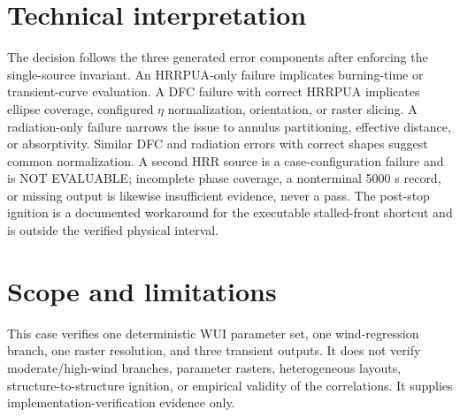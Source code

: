 \section{Technical interpretation}

The \VerificationStatus{} decision follows the three generated error components after enforcing the single-source invariant. An HRRPUA-only failure implicates burning-time or transient-curve evaluation. A DFC failure with correct HRRPUA implicates ellipse coverage, configured \(\eta\) normalization, orientation, or raster slicing. A radiation-only failure narrows the issue to annulus partitioning, effective distance, or absorptivity. Similar DFC and radiation errors with correct shapes suggest common normalization. A second HRR source is a case-configuration failure and is NOT EVALUABLE; incomplete phase coverage, a nonterminal 5000 s record, or missing output is likewise insufficient evidence, never a pass. The post-stop ignition is a documented workaround for the executable stalled-front shortcut and is outside the verified physical interval.

\section{Scope and limitations}

This case verifies one deterministic WUI parameter set, one wind-regression branch, one raster resolution, and three transient outputs. It does not verify moderate/high-wind branches, parameter rasters, heterogeneous layouts, structure-to-structure ignition, or empirical validity of the correlations. It supplies implementation-verification evidence only.

